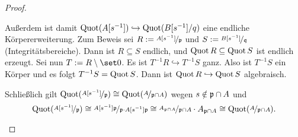 \documentclass[12pt,a4paper]{scrartcl}
\theoremstyle{cplain}
\theoremstyle{cdef}
\begin{document}
\begin{proof}
\begin{enumerate}[label=\ref{kor:7.17:\roman*}]
		Außerdem ist damit $\operatorname{Quot}(A[s^{-1}]) \hookrightarrow \operatorname{Quot}(B[s^{-1}]/q)$ eine endliche Körpererweiterung. Zum Beweis sei $R := \nicefrac{A[s^{-1}]}{\mathfrak{p}}$ und $S := \nicefrac{B[s^{-1}]}{\mathfrak{q}}$ (Integritätsbereiche). Dann ist $R \subseteq S$ endlich, und $\operatorname{Quot} R \subseteq \operatorname{Quot} S$ ist endlich erzeugt. Sei nun $T := R \setminus \set 0$. Es ist $T^{-1}R \hookrightarrow T^{-1}S$ ganz. Also ist $T^{-1}S$ ein Körper und es folgt $T^{-1}S = \operatorname{Quot} S$. Dann ist $\operatorname{Quot} R \hookrightarrow \operatorname{Quot} S$ algebraisch.
		
		Schließlich gilt $\operatorname{Quot}(\nicefrac{A[s^{-1}]}{\mathfrak{p}}) \cong \operatorname{Quot}(\nicefrac{A}{\mathfrak{p} \cap A})$ wegen $s \notin \mathfrak{p} \cap A$ und \[\operatorname{Quot}(\nicefrac{A[s^{-1}]}{\mathfrak{p}}) \cong \nicefrac{A[s^{-1}]\mathfrak{p}}{\mathfrak{p} \cdot A[s^{-1}]\mathfrak{p}} \cong \nicefrac{A_{\mathfrak{p} \cap A}}{\mathfrak{p} \cap A} \cdot A_{\mathfrak{p} \cap A} \cong \operatorname{Quot}(\nicefrac{A}{\mathfrak{p} \cap A}). \qedhere \]
	\end{enumerate}
\end{proof}
\end{document}

